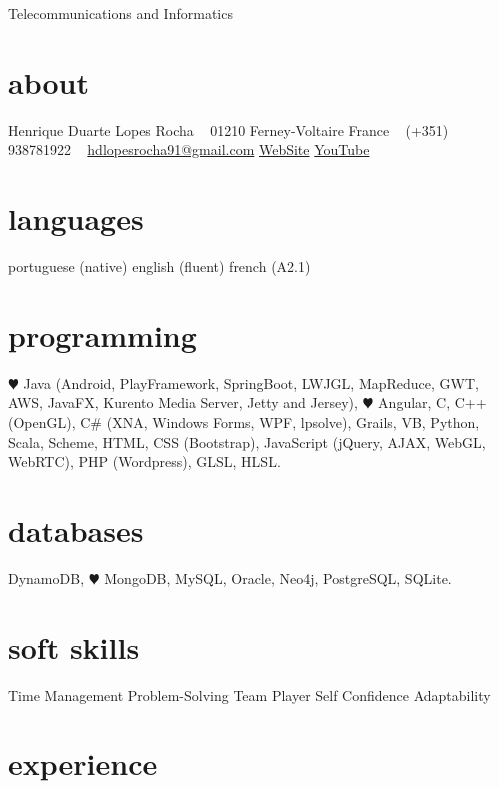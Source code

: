 \documentclass[]{friggeri-cv}
\begin{document}
       {Telecommunications and Informatics}

\begin{aside}
  \section{about}
    Henrique Duarte Lopes Rocha
    ~
    01210 Ferney-Voltaire
    France
    ~
    (+351) 938781922
    ~
    \href{mailto:hdlopesrocha91@gmail.com}{hdlopesrocha91@gmail.com}
    \href{http://web.ist.utl.pt/ist168621}{WebSite}
    \href{http://www.youtube.com/user/hdlopesrocha}{YouTube}
  \section{languages}
    portuguese (native)
    english (fluent)
    french (A2.1)
  \section{programming}
    {\color{red} $\varheartsuit$} Java
	(Android, PlayFramework, SpringBoot, LWJGL, MapReduce, GWT, AWS, JavaFX, Kurento Media Server, Jetty and Jersey), 
	{\color{yellow} $\varheartsuit$} Angular, C, C++ (OpenGL), C\# (XNA, Windows Forms, WPF, lpsolve), Grails, VB, Python, Scala, Scheme, 
	HTML, CSS (Bootstrap), JavaScript (jQuery, AJAX, WebGL, WebRTC), PHP (Wordpress), GLSL, HLSL.
\section{databases}
	DynamoDB, {\color{green} $\varheartsuit$} MongoDB, MySQL, Oracle, Neo4j, PostgreSQL, SQLite.
   \section{soft skills}
	Time Management
	Problem-Solving
	Team Player
	Self Confidence
	Adaptability
\end{aside}



\section{experience}
\end{document}
